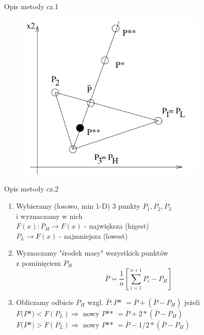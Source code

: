   \begin{frame}{Opis metody cz.1}

  	\begin{figure}
		\centering
		\includegraphics[height=0.8\textheight ,width=0.8\textwidth]{img/17/simplex_method}
	\end{figure}

  \end{frame}

  \begin{frame}{Opis metody cz.2}

	\begin{enumerate}
		\item Wybieramy (losowo, min 1-D) 3 punkty $P_1,P_2,P_3$
		\\i wyznaczamy w nich
		\\ $F(x): P_H \rightarrow F(x)$ - największa (higest)
		\\ $P_L \rightarrow F(x)$ - najmniejsza (lowest)
		\item Wyznaczamy "środek masy" wszystkich punktów
		\\z pominięciem $P_H$
		  \begin{displaymath}
		    \overline{P}=\frac{1}{n}[\sum_{i=1}^{n+1}P_i-P_H]
		  \end{displaymath}
		\item Obliczamy odbicie $P_H$ wzgl. $\overline{P} : P$* $= \overline{P}+(\overline{P}-P_H)$ jeżeli
		\\ $F(P$*$) < F(P_L) \Rightarrow$ nowy $P$** $= \overline{P}+2*(\overline{P}-P_H)$
		\\ $F(P$*$) > F(P_L) \Rightarrow$ nowy $P$** $= \overline{P}-1/2*(\overline{P}-P_H)$
		\setcounter{saveenumi}{\value{enumi}}
	\end{enumerate}

  \end{frame}

